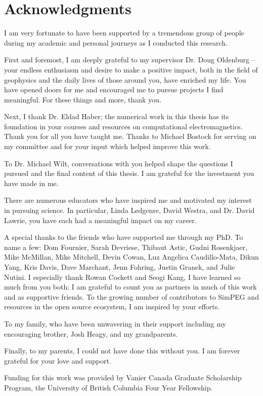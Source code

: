 
\chapter{Acknowledgments}

I am very fortunate to have been supported by a tremendous group of people during my academic and personal journeys as I conducted this research.

First and foremost, I am deeply grateful to my supervisor Dr. Doug Oldenburg -- your endless enthusiasm and desire to make a positive impact, both in the field of geophysics and the daily lives of those around you, have enriched my life. You have opened doors for me and encouraged me to pursue projects I find meaningful. For these things and more, thank you.

Next, I thank Dr. Eldad Haber; the numerical work in this thesis has its foundation in your courses and resources on computational electromagnetics. Thank you for all you have taught me. Thanks to Michael Bostock for serving on my committee and for your input which helped improve this work.

To Dr. Michael Wilt, conversations with you helped shape the questions I pursued and the final content of this thesis. I am grateful for the investment you have made in me.

There are numerous educators who have inspired me and motivated my interest in pursuing science. In particular, Linda Ledgenre, David Westra, and Dr. David Lawrie, you have each had a meaningful impact on my career.

A special thanks to the friends who have supported me through my PhD. To name a few: Dom Fournier, Sarah Devriese, Thibaut Astic, Gudni Rosenkjaer, Mike McMillan, Mike Mitchell, Devin Cowan, Luz Angelica Caudillo-Mata, Dikun Yang, Kris Davis, Dave Marchant, Jenn Fohring, Justin Granek, and Julie Nutini. I especially thank Rowan Cockett and Seogi Kang, I have learned so much from you both; I am grateful to count you as partners in much of this work and as supportive friends. To the growing number of contributors to SimPEG and resources in the open source ecosystem, I am inspired by your efforts.

To my family, who have been unwavering in their support including my encouraging brother, Josh Heagy, and my grandparents.

Finally, to my parents, I could not have done this without you. I am forever grateful for your love and support.

Funding for this work was provided by Vanier Canada Graduate Scholarship Program, the University of British Columbia Four Year Fellowship.
